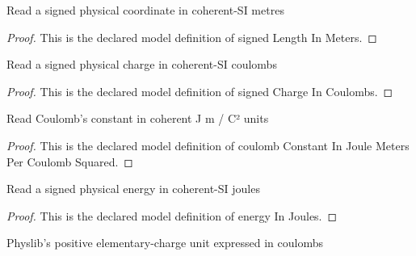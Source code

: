 \begin{definition}
  \label{def:physics:phyx-mini-0854:phyxminiproblems-problemphyxmini0854-signedlengthinmeters}
  Read a signed physical coordinate in coherent-SI metres
\end{definition}
\begin{proof}
  This is the declared model definition of signed Length In Meters.
\end{proof}
\begin{definition}
  \label{def:physics:phyx-mini-0854:phyxminiproblems-problemphyxmini0854-signedchargeincoulombs}
  Read a signed physical charge in coherent-SI coulombs
\end{definition}
\begin{proof}
  This is the declared model definition of signed Charge In Coulombs.
\end{proof}
\begin{definition}
  \label{def:physics:phyx-mini-0854:phyxminiproblems-problemphyxmini0854-coulombconstantinjoulemeterspercoulombsquared}
  Read Coulomb's constant in coherent J m / C² units
\end{definition}
\begin{proof}
  This is the declared model definition of coulomb Constant In Joule Meters Per Coulomb Squared.
\end{proof}
\begin{definition}
  \label{def:physics:phyx-mini-0854:phyxminiproblems-problemphyxmini0854-energyinjoules}
  Read a signed physical energy in coherent-SI joules
\end{definition}
\begin{proof}
  This is the declared model definition of energy In Joules.
\end{proof}
\begin{definition}
  \label{def:physics:phyx-mini-0854:phyxminiproblems-problemphyxmini0854-elementarychargeincoulombs}
  Physlib's positive elementary-charge unit expressed in coulombs
\end{definition}
